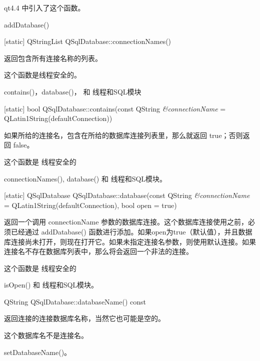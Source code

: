 qt4.4 中引入了这个函数。

\begin{seeAlso}
addDatabase()
\end{seeAlso}


[static] QStringList QSqlDatabase::connectionNames()

返回包含所有连接名称的列表。

\begin{notice}
这个函数是线程安全的。
\end{notice} 

\begin{seeAlso}
contains()，database()， 和 线程和SQL模块
\end{seeAlso}

[static] bool QSqlDatabase::contains(const QString \emph{\&connectionName} = QLatin1String(defaultConnection))


如果所给的连接名，包含在所给的数据库连接列表里，那么就返回 true；否则返回 false。

\begin{notice}
这个函数是 线程安全的
\end{notice} 

\begin{seeAlso}
connectionNames(), database() 和 线程和SQL模块。
\end{seeAlso}


[static] QSqlDatabase QSqlDatabase::database(const QString \emph{\&connectionName} = QLatin1String(defaultConnection), bool open = true)

返回一个调用 connectionName 参数的数据库连接。这个数据库连接使用之前，必须已经通过 addDatabase() 函数进行添加。如果open为true（默认值），并且数据库连接尚未打开，则现在打开它。如果未指定连接名参数，则使用默认连接。如果连接名不存在数据库列表中，那么将会返回一个非法的连接。

\begin{notice}
这个函数是 线程安全的
\end{notice}

\begin{seeAlso}
 isOpen() 和 线程和SQL模块。
\end{seeAlso}

QString QSqlDatabase::databaseName() const

返回连接的连接数据库名称，当然它也可能是空的。

\begin{notice}
这个数据库名不是连接名。
\end{notice}

\begin{seeAlso}
setDatabaseName()。
\end{seeAlso}

